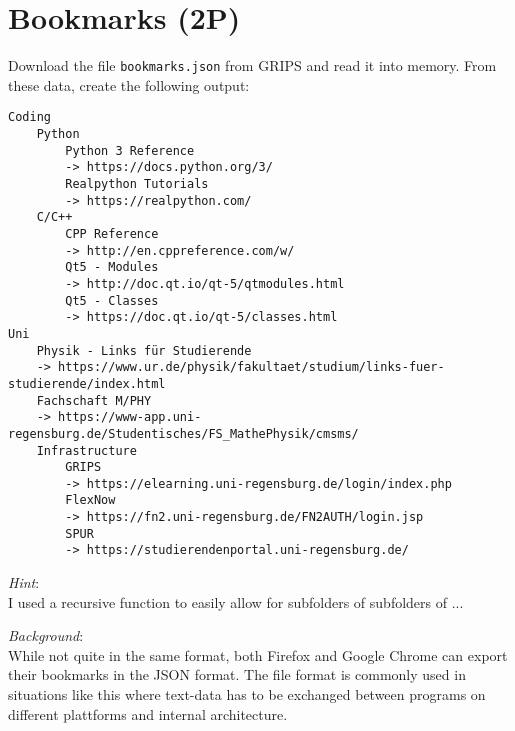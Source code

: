 \documentclass[
	ngerman,
	fontsize=10pt,
	parskip=half,
	titlepage=true,
	DIV=12
]{scrartcl}
\begin{document}
\section{Bookmarks (2\;P)}
Download the file \texttt{bookmarks.json} from GRIPS and read it into memory. From these data, create the following output:
\begin{verbatim}
Coding
    Python
        Python 3 Reference
        -> https://docs.python.org/3/
        Realpython Tutorials
        -> https://realpython.com/
    C/C++
        CPP Reference
        -> http://en.cppreference.com/w/
        Qt5 - Modules
        -> http://doc.qt.io/qt-5/qtmodules.html
        Qt5 - Classes
        -> https://doc.qt.io/qt-5/classes.html
Uni
    Physik - Links für Studierende
    -> https://www.ur.de/physik/fakultaet/studium/links-fuer-studierende/index.html
    Fachschaft M/PHY
    -> https://www-app.uni-regensburg.de/Studentisches/FS_MathePhysik/cmsms/
    Infrastructure
        GRIPS
        -> https://elearning.uni-regensburg.de/login/index.php
        FlexNow
        -> https://fn2.uni-regensburg.de/FN2AUTH/login.jsp
        SPUR
        -> https://studierendenportal.uni-regensburg.de/
\end{verbatim}

\emph{Hint}:\\
I used a recursive function to easily allow for subfolders of subfolders of ...

\emph{Background}:\\
While not quite in the same format, both Firefox and Google Chrome can export their bookmarks in the JSON format. The file format is commonly used in situations like this where text-data has to be exchanged between programs on different plattforms and internal architecture.
\end{document}

